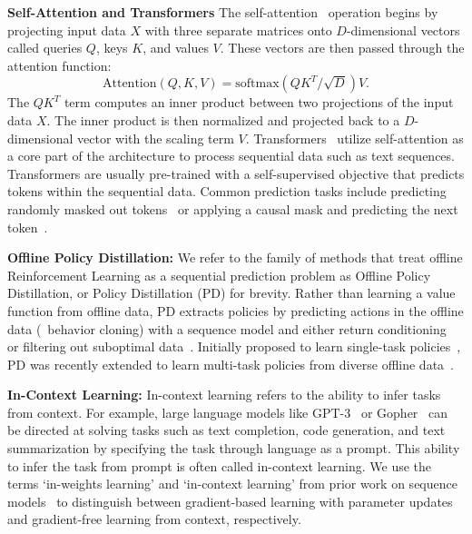 {\bf Self-Attention and Transformers}
The self-attention~\citep{vaswani2017attention} operation begins by projecting input data $X$ with three separate matrices onto $D$-dimensional vectors called queries $Q$, keys $K$, and values $V$. These vectors are then passed through the attention function:
\begin{equation}
    \text{Attention}(Q,K,V) = \text{softmax} (Q K^T / \sqrt{D}) V.
\end{equation}
The $QK^T$ term computes an inner product between two projections of the input data $X$. The inner product is then normalized and projected back to a $D$-dimensional vector with the scaling term $V$. Transformers~\citep{vaswani2017attention, devlin2018bert, brown2020gpt3} utilize self-attention as a core part of the architecture to process sequential data such as text sequences. Transformers are usually pre-trained with a self-supervised objective that predicts tokens within the sequential data. Common prediction tasks include predicting randomly masked out tokens~\citep{devlin2018bert} or applying a causal mask and predicting the next token~\citep{radford2018improving}. 

{\bf Offline Policy Distillation:} We refer to the family of methods that treat offline Reinforcement Learning as a sequential prediction problem as Offline Policy Distillation, or Policy Distillation (PD) for brevity. Rather than learning a value function from offline data, PD extracts policies by predicting actions in the offline data (\ie\, behavior cloning) with a sequence model and either return conditioning~\citep{chen2021dt, lee2022mgdt} or filtering out suboptimal data~\citep{reed2022gato}. Initially proposed to learn single-task policies~\citep{chen2021dt, janner2021tto}, PD was recently extended to learn multi-task policies from diverse offline data~\citep{lee2022mgdt, reed2022gato}.

{\bf In-Context Learning:} In-context learning refers to the ability to infer tasks from context. For example, large language models like GPT-3~\citep{brown2020gpt3} or Gopher~\citep{rae2012gopher} can be directed at solving tasks such as text completion, code generation, and text summarization by specifying the task through language as a prompt. This ability to infer the task from prompt is often called in-context learning. We use the terms `in-weights learning' and `in-context learning' from prior work on sequence models~\citep{brown2020gpt3,chan2022data} to distinguish between gradient-based learning with parameter updates and gradient-free learning from context, respectively.

